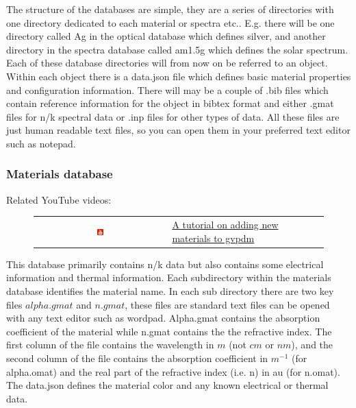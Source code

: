 The structure of the databases are simple, they are a series of directories with one directory dedicated to each material or spectra etc.. E.g. there will be one directory called Ag in the optical database which defines silver, and another directory in the spectra database called am1.5g which defines the solar spectrum.  Each of these database directories will from now on be referred to an object.  Within each object there is a data.json file which defines basic material properties and configuration information.  There will may be a couple of .bib files which contain reference information for the object in bibtex format and either .gmat files for n/k spectral data or .inp files for other types of data.  All these files are just human readable text files, so you can open them in your preferred text editor such as notepad.


\subsubsection{Materials database}
\label{sec:materialdatabase}
Related YouTube videos:
\begin{figure}[H]

\begin{tabular}{ c l }

\includegraphics[width=0.05\textwidth]{./images/youtube.png}

&
\href{https://www.youtube.com/watch?v=0u6_jRVhZwU}{A tutorial on adding new materials to gvpdm}

\end{tabular}
\end{figure}

This database primarily contains n/k data but also contains some electrical information and thermal information. Each subdirectory within the materials database identifies the material name.  In each sub directory there are two key files $alpha.gmat$ and $n.gmat$, these files are standard text files can be opened with any text editor such as wordpad.    Alpha.gmat contains the absorption coefficient of the material while n.gmat contains the the refractive index.  The first column of the file contains the wavelength in $m$ (not $cm$ or $nm$), and the second column of the file contains the absorption coefficient in $m^{-1}$ (for alpha.omat) and the real part of the refractive index (i.e. n) in au (for n.omat). The data.json defines the material color and any known electrical or thermal data.


